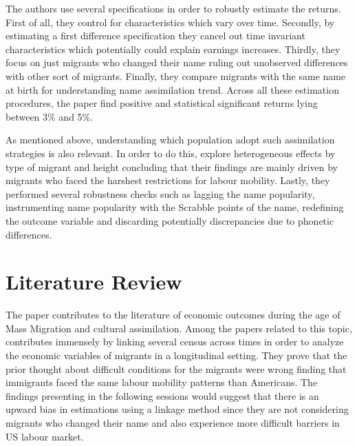\documentclass[12pt]{article}
\begin{document}
\medskip

The authors use several specifications in order to robustly estimate the returns. First of all, they control for characteristics which vary over time. Secondly, by estimating a first difference specification they cancel out time invariant characteristics which potentially could explain earnings increases. Thirdly, they focus on just migrants who changed their name ruling out unobserved differences with other sort of migrants. Finally, they compare migrants with the same name at birth for understanding name assimilation trend. Across all these estimation procedures, the paper  find positive and statistical significant returns lying between 3\% and 5\%. 

\medskip

As mentioned above, understanding which population adopt such assimilation strategies is also relevant. In order to do this, \cite{biavaschi2017economic} explore heterogeneous effects by type of migrant and height concluding that their findings are mainly driven by migrants who faced the harshest restrictions for labour mobility. Lastly, they performed several robustness checks such as lagging the name popularity, instrumenting name popularity with the Scrabble points of the name, redefining the outcome variable and discarding potentially discrepancies due to phonetic differences. 


\section{Literature Review}

The paper contributes to the literature of economic outcomes during the age of Mass Migration and cultural assimilation. Among the papers related to this topic, \cite{abramitzky2014nation} contributes immensely by linking several census across times in order to analyze the economic variables of migrants in a longitudinal setting. They prove that the prior thought about difficult conditions for the migrants were wrong finding that immigrants faced the same labour mobility patterns than Americans. The findings presenting in the following sessions would suggest that there is an upward bias in estimations using a linkage method since they are not considering migrants who changed their name and also experience more difficult barriers in US labour market.

\medskip
\end{document}
